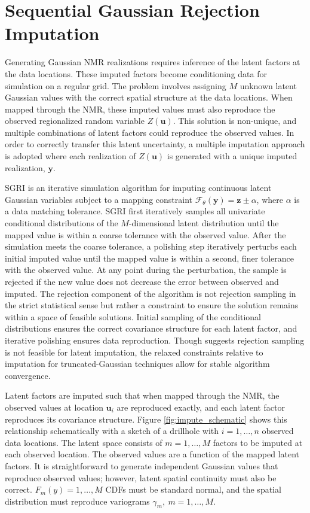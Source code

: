 \FloatBarrier
\section{Sequential Gaussian Rejection Imputation}
\label{sec:sgri}

Generating Gaussian \gls{NMR} realizations requires inference of the latent factors at the data locations. These imputed factors become conditioning data for simulation on a regular grid. The problem involves assigning $M$ unknown latent Gaussian values with the correct spatial structure at the data locations. When mapped through the \gls{NMR}, these imputed values must also reproduce the observed regionalized random variable $Z(\mathbf{u})$. This solution is non-unique, and multiple combinations of latent factors could reproduce the observed values. In order to correctly transfer this latent uncertainty, a multiple imputation \citep{barnett2015multivariate} approach is adopted where each realization of $Z(\mathbf{u})$ is generated with a unique imputed realization, $\mathbf{y}$.

\Gls{SGRI} is an iterative simulation algorithm for imputing continuous latent Gaussian variables subject to a mapping constraint $\mathcal{F}_{\theta}\left(\mathbf{y}\right)=\mathbf{z} \pm \alpha$, where $\alpha$ is a data matching tolerance. \Gls{SGRI} first iteratively samples all univariate conditional distributions of the $M$-dimensional latent distribution until the mapped value is within a coarse tolerance with the observed value. After the simulation meets the coarse tolerance, a polishing step iteratively perturbs each initial imputed value until the mapped value is within a second, finer tolerance with the observed value. At any point during the perturbation, the sample is rejected if the new value does not decrease the error between observed and imputed. The rejection component of the algorithm is not rejection sampling in the strict statistical sense but rather a constraint to ensure the solution remains within a space of feasible solutions. Initial sampling of the conditional distributions ensures the correct covariance structure for each latent factor, and iterative polishing ensures data reproduction. Though \cite{armstrong2011plurigaussian} suggests rejection sampling is not feasible for latent imputation, the relaxed constraints relative to imputation for truncated-Gaussian techniques allow for stable algorithm convergence.

Latent factors are imputed such that when mapped through the \gls{NMR}, the observed values at location $\mathbf{u}_{i}$ are reproduced exactly, and each latent factor reproduces its covariance structure. Figure \ref{fig:impute_schematic} shows this relationship schematically with a sketch of a drillhole with $i=1,\dots,n$ observed data locations. The latent space consists of $m=1,\dots,M$ factors to be imputed at each observed location. The observed values are a function of the mapped latent factors. It is straightforward to generate independent Gaussian values that reproduce observed values; however, latent spatial continuity must also be correct. $F_{m}(y)=1,\dots,M$ \glspl{CDF} must be standard normal, and the spatial distribution must reproduce variograms $\gamma_{m}, \ m=1,\dots,M$.


